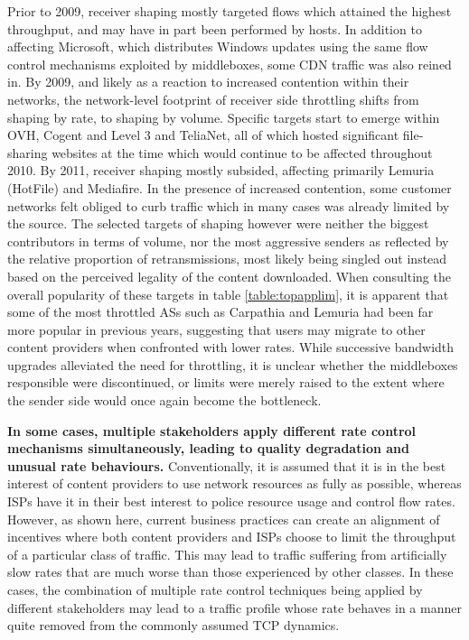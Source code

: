 Prior to 2009, receiver shaping mostly targeted flows which attained the highest throughput, and may have in part been performed by hosts. 
In addition to affecting Microsoft, which distributes Windows updates using the same flow control mechanisms exploited by middleboxes, some \ac{CDN} traffic was also reined in.
By 2009, and likely as a reaction to increased contention within their networks, the network-level footprint of receiver side throttling shifts from shaping by rate, to shaping by volume.
Specific targets start to emerge within OVH, Cogent and Level 3 and TeliaNet, all of which hosted significant file-sharing websites at the time which would continue to be affected throughout 2010.
By 2011, receiver shaping mostly subsided, affecting primarily Lemuria (HotFile) and Mediafire.
In the presence of increased contention, some customer networks felt obliged to curb traffic which in many cases was already limited by the source.
The selected targets of shaping however were neither the biggest contributors in terms of volume, nor the most aggressive senders as reflected by the relative proportion of retransmissions, most likely being singled out instead based on the perceived legality of the content downloaded.
When consulting the overall popularity of these targets in table \ref{table:topapplim}, it is apparent that some of the most throttled \acp{AS} such as Carpathia and Lemuria had been far more popular in previous years, suggesting that users may migrate to other content providers when confronted with lower rates.
While successive bandwidth upgrades alleviated the need for throttling, it is unclear whether the middleboxes responsible were discontinued, or limits were merely raised to the extent where the sender side would once again become the bottleneck.

\textbf{In some cases, multiple stakeholders apply different rate control mechanisms simultaneously, leading to quality degradation and unusual rate behaviours.}
Conventionally, it is assumed that it is in the best interest of content providers to use network resources as fully as possible, whereas \acp{ISP} have it in their best interest to police resource usage and control flow rates. 
However, as shown here, current business practices can create an alignment of incentives where both content providers and \acp{ISP} choose to limit the throughput of a particular class of traffic. 
This may lead to traffic suffering from artificially slow rates that are much worse than those experienced by other classes. 
In these cases, the combination of multiple rate control techniques being applied by different stakeholders may lead to a traffic profile whose rate behaves in a manner quite removed from the commonly assumed \ac{TCP} dynamics.

